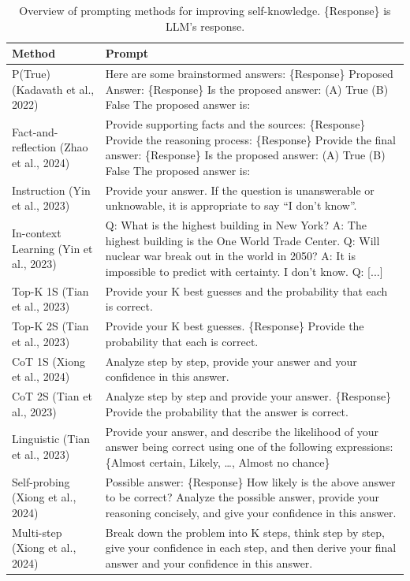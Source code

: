 \begin{table}[t]
\centering
\caption{Overview of prompting methods for improving self-knowledge. \{Response\} is LLM's response.}
\label{tab:prompt_sk}
\small
\begin{tabular}{p{3.2cm} p{9.5cm}}
\toprule
\textbf{Method} & \textbf{Prompt} \\
\midrule
P(True) (Kadavath et al., 2022) & Here are some brainstormed answers: \{Response\} Proposed Answer: \{Response\} Is the proposed answer: (A) True (B) False The proposed answer is: \\
\addlinespace
Fact-and-reflection (Zhao et al., 2024) & Provide supporting facts and the sources: \{Response\} Provide the reasoning process: \{Response\} Provide the final answer: \{Response\} Is the proposed answer: (A) True (B) False The proposed answer is: \\
\addlinespace
Instruction (Yin et al., 2023) & Provide your answer. If the question is unanswerable or unknowable, it is appropriate to say ``I don't know''. \\
\addlinespace
In-context Learning (Yin et al., 2023) & Q: What is the highest building in New York? A: The highest building is the One World Trade Center. Q: Will nuclear war break out in the world in 2050? A: It is impossible to predict with certainty. I don't know. Q: [...] \\
\addlinespace
Top-K 1S (Tian et al., 2023) & Provide your K best guesses and the probability that each is correct. \\
\addlinespace
Top-K 2S (Tian et al., 2023) & Provide your K best guesses. \{Response\} Provide the probability that each is correct. \\
\addlinespace
CoT 1S (Xiong et al., 2024) & Analyze step by step, provide your answer and your confidence in this answer. \\
\addlinespace
CoT 2S (Tian et al., 2023) & Analyze step by step and provide your answer. \{Response\} Provide the probability that the answer is correct. \\
\addlinespace
Linguistic (Tian et al., 2023) & Provide your answer, and describe the likelihood of your answer being correct using one of the following expressions: \{Almost certain, Likely, \ldots, Almost no chance\} \\
\addlinespace
Self-probing (Xiong et al., 2024) & Possible answer: \{Response\} How likely is the above answer to be correct? Analyze the possible answer, provide your reasoning concisely, and give your confidence in this answer. \\
\addlinespace
Multi-step (Xiong et al., 2024) & Break down the problem into K steps, think step by step, give your confidence in each step, and then derive your final answer and your confidence in this answer. \\
\bottomrule
\end{tabular}
\end{table}

